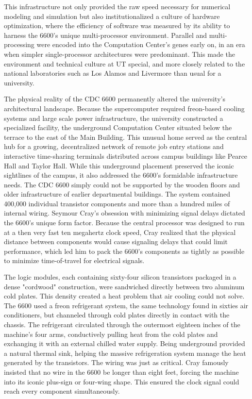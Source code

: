 This infrastructure not only provided the raw speed necessary for numerical modeling and simulation but also institutionalized a culture of hardware optimization, where the efficiency of software was measured by its ability to harness the 6600’s unique multi-processor environment. Parallel and multi-processing were encoded into the Computation Center’s genes early on, in an era when simpler single-processor architectures were predominant. This made the environment and technical culture at UT special, and more closely related to the national laboratories such as Los Alamos and Livermore than usual for a university.

The physical reality of the CDC 6600 permanently altered the university's architectural landscape. Because the supercomputer required freon-based cooling systems and large scale power infrastructure, the university constructed a specialized facility, the underground Computation Center situated below the terrace to the east of the Main Building. This unusual home served as the central hub for a growing, decentralized network of remote job entry stations and interactive time-sharing terminals distributed across campus buildings like Pearce Hall and Taylor Hall. While this underground placement preserved the iconic sightlines of the campus, it also addressed the 6600’s formidable infrastructure needs. The CDC 6600 simply could not be supported by the wooden floors and older infrastructure of earlier departmental buildings. The system contained 400,000 individual transistor components and more than a hundred miles of internal wiring. Seymour Cray’s obsession with minimizing signal delays dictated the 6600's unique form factor. Because the central processor was designed to run at a then very fast ten megahertz clock speed, Cray realized that the physical distance between components would cause signaling delays that could limit performance, which led him to pack the 6600's components as tightly as possible to minimize time-of-travel for electrical signals. 

The logic modules, each containing sixty-four silicon transistors packaged in a dense "cordwood" construction, were sandwiched directly between two aluminum cold plates. This density created a heat problem that air cooling could not solve. The 6600 used a freon refrigerant system, the same technology found in sixties air conditioners, but channeled through cold plates directly in contact with the chassis. The refrigerant circulated through the outermost eighteen inches of the machine's four arms, conductively pulling heat from the cold plates and exchanging it with an external chilled water supply. Being underground provided a natural thermal sink, helping the massive refrigeration system manage the heat generated by the transistors. The wiring was just as critical. Cray famously insisted that no wire in the 6600 be longer than eight feet, forcing the machine into its iconic plus-sign or four-wing shape. This ensured the clock signal could reach every component simultaneously. 

